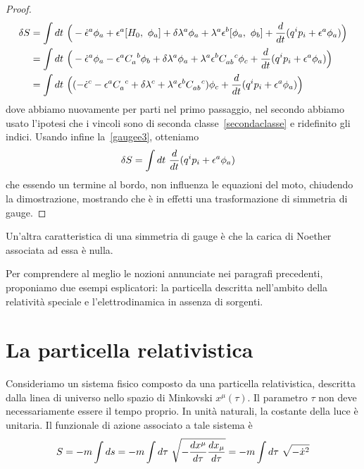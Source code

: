 \begin{proof}
    \begin{equation*}
    \begin{aligned}
        \delta S & = \int dt ~ \Big (- \dot \epsilon^a \phi_a + \epsilon^a \poi{H_0}{\phi_a} + \delta \lambda^a \phi_a + \lambda^a \epsilon^b \poi{\phi_a}{\phi_b} + \dv{}{t} (q^i p_i + \epsilon^a \phi_a) \Big ) \\ & = \int dt ~ \Big (- \dot \epsilon^a \phi_a - \epsilon^a  C_a^{\phantom a b} \phi_b + \delta \lambda^a \phi_a + \lambda^a \epsilon^b C_{ab}^{\phantom{ab} c} \phi_c + \dv{}{t} (q^i p_i + \epsilon^a \phi_a) \Big ) \\ & = \int dt ~ \Big ((- \dot \epsilon^c - \epsilon^a  C_a^{\phantom a c} + \delta \lambda^c + \lambda^a \epsilon^b C_{ab}^{\phantom{ab} c} )\phi_c + \dv{}{t} (q^i p_i + \epsilon^a \phi_a) \Big ) 
    \end{aligned}
    \end{equation*}
    dove abbiamo nuovamente per parti nel primo passaggio, nel secondo abbiamo usato l'ipotesi che i vincoli sono di seconda classe~\eqref{secondaclasse} e ridefinito gli indici. Usando infine la~\eqref{gaugee3}, otteniamo
    \begin{equation}
    \begin{aligned}
       \delta S & = \int dt ~ \frac{d}{dt} (q^i p_i + \epsilon^a \phi_a)
    \end{aligned}
    \end{equation}
    che essendo un termine al bordo, non influenza le equazioni del moto, chiudendo la dimostrazione, mostrando che è in effetti una trasformazione di simmetria di gauge.
    \end{proof}

    Un'altra caratteristica di una simmetria di gauge è che la carica di Noether associata ad essa è nulla.

    \hfill

    Per comprendere al meglio le nozioni annunciate nei paragrafi precedenti, proponiamo due esempi esplicatori: la particella descritta nell'ambito della relatività speciale e l'elettrodinamica in assenza di sorgenti. 

\section{La particella relativistica}

    Consideriamo un sistema fisico composto da una particella relativistica, descritta dalla linea di universo nello spazio di Minkovski $x^\mu(\tau)$. Il parametro $\tau$ non deve necessariamente essere il tempo proprio. In unità naturali, la costante della luce è unitaria. Il funzionale di azione associato a tale sistema è
    \begin{equation} \label{azionerel}
        S = - m \int ds = - m \int d\tau ~ \sqrt{- \frac{dx^\mu}{d\tau}\frac{dx_\mu}{d\tau}} = - m \int d\tau ~ \sqrt{- \dot x^2}
    \end{equation}
    
